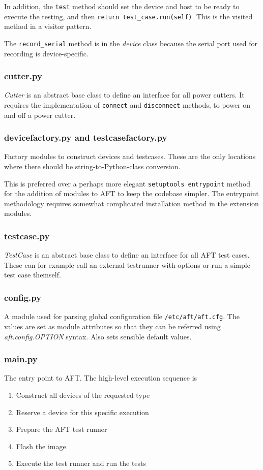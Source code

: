 \documentclass[a4paper,11pt]{article}
\newcommand{\cmd}[1]{\texttt{#1}}
\begin{document}
In addition, the \cmd{test} method should set the device and host to be ready to execute the testing, and then \cmd{return test\_case.run(self)}. This is the visited method in a visitor pattern.

The \cmd{record\_serial} method is in the \emph{device} class because the serial port used for recording is device-specific.

\subsubsection*{cutter.py}
\emph{Cutter} is an abstract base class to define an interface for all power cutters. It requires the implementation of \cmd{connect} and \cmd{disconnect} methods, to power on and off a power cutter.

\subsubsection*{devicefactory.py and testcasefactory.py}
Factory modules to construct devices and testcases. These are the only locations where there should be string-to-Python-class conversion.

This is preferred over a perhaps more elegant \cmd{setuptools entrypoint} method for the addition of modules to AFT to keep the codebase simpler. The entrypoint methodology requires somewhat complicated installation method in the extension modules.

\subsubsection*{testcase.py}
\emph{TestCase} is an abstract base class to define an interface for all AFT test cases. These can for example call an external testrunner with options or run a simple test case themself.

\subsubsection*{config.py}
A module used for parsing global configuration file \cmd{/etc/aft/aft.cfg}. The values are set as module attributes so that they can be referred using \emph{aft.config.OPTION} syntax. Also sets sensible default values.

\subsubsection*{main.py}
The entry point to AFT. The high-level execution sequence is
\begin{enumerate}
\item Construct all devices of the requested type
\item Reserve a device for this specific execution
\item Prepare the AFT test runner
\item Flash the image
\item Execute the test runner and run the tests
\end{enumerate}
\end{document}

